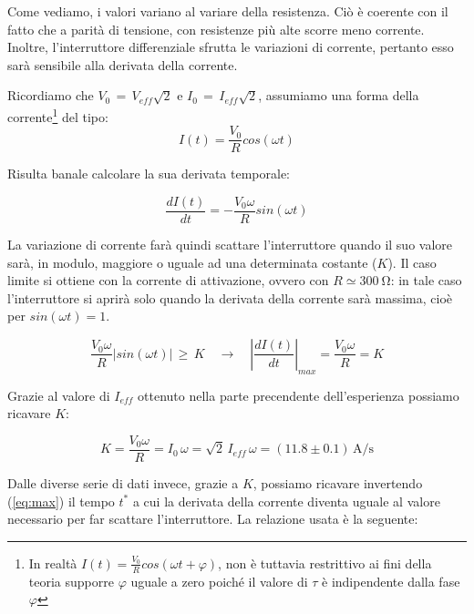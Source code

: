 Come vediamo, i valori variano al variare della resistenza. Ciò è coerente con il fatto che a parità di tensione, con resistenze più alte scorre meno corrente. Inoltre, l'interruttore differenziale sfrutta le variazioni di corrente, pertanto esso sarà sensibile alla derivata della corrente.

\noindent Ricordiamo che $V_0 \, = \, V_{eff} \sqrt{2}$ e $I_0 \, = \, I_{eff} \sqrt{2}$, assumiamo una forma della corrente\footnote{In realtà $I(t)=\frac{V_0}{R}cos(\omega t + \varphi)$, non è tuttavia restrittivo ai fini della teoria supporre $\varphi$ uguale a zero poiché il valore di $\tau$ è indipendente dalla fase $\varphi$} del tipo:
\begin{equation}
I(t)=\frac{V_0}{R}cos(\omega t)
\label{eq:corrente}
\end{equation}

Risulta banale calcolare la sua derivata temporale:

\begin{equation}
\frac{dI(t)}{dt}=-\frac{V_0 \omega}{R}sin(\omega t)
\label{eq:derivata}
\end{equation}

\noindent La variazione di corrente farà quindi scattare l'interruttore quando il suo valore sarà, in modulo, maggiore o uguale ad una determinata costante ($K$). Il caso limite si ottiene con la corrente di attivazione, ovvero con $R \simeq \SI{300}{\ohm}$: in tale caso l'interruttore si aprirà solo quando la derivata della corrente sarà massima, cioè per $sin(\omega t) = 1$.

\begin{equation}
\frac{V_0 \omega}{R}|sin(\omega t)| \, \geq \, K	\quad \longrightarrow  \quad	
\left\vert \frac{dI(t)}{dt} \right\vert_{max} = \frac{V_0 \omega}{R} = K
\label{eq:max}
\end{equation}

\noindent Grazie al valore di $I_{eff}$ ottenuto nella parte precendente dell'esperienza possiamo ricavare $K$:

\begin{equation}
K = \frac{V_0 \omega}{R} = I_0 \,\omega = \sqrt{2}\,I_{eff} \,\omega  = (11.8 \pm 0.1)\, \si{\ampere\per\second}
\label{eq:K}
\end{equation}

\noindent Dalle diverse serie di dati invece, grazie a $K$, possiamo ricavare invertendo (\ref{eq:max}) il tempo $t^*$ a cui la derivata della corrente diventa uguale al valore necessario per far scattare l'interruttore. La relazione usata è la seguente:

